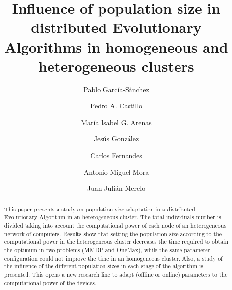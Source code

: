 \documentclass[final,1p,times]{elsarticle}
\begin{document}
\begin{frontmatter}



\title{Influence of population size in distributed Evolutionary Algorithms in homogeneous and heterogeneous clusters}


\author[ugr]{Pablo Garc\'ia-S\'anchez}
\author[ugr]{Pedro A. Castillo}
\author[ugr]{Mar\'ia Isabel G. Arenas}
\author[ugr]{Jes\'us Gonz\'alez}
\author[laseeb]{Carlos Fernandes}
\author[ugr]{Antonio Miguel Mora}
\author[ugr]{Juan Juli\'an Merelo}

\address[ugr]{Department of Computer Architecture and Computer Technology and CITIC-UGR, University of Granada, Granada, Spain. Tel: +34958241778. Fax: +34958248993}
\address[laseeb]{Institute of Advanced ICT, Polytechnic University of Valencia, Valencia, Spain}%

\begin{abstract}
This paper presents a study on population size adaptation in a distributed Evolutionary Algorithm in an heterogeneous cluster. The total individuals number is divided taking into account the computational power of each node of an heterogeneous network of computers. Results show that setting the population size according to the computational power in the heterogeneous cluster decreases the time required to obtain the optimum in two problems (MMDP and OneMax), while the same parameter configuration could not improve the time in an homogeneous cluster. Also, a study of the influence of the different population sizes in each stage of the algorithm is presented. This opens a new research line to adapt (offline or online) parameters to the computational power of the devices.


\end{abstract}
\end{frontmatter}
\end{document}
